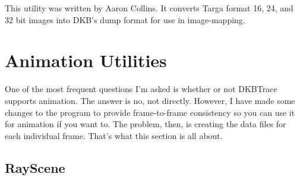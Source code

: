 This utility was written by Aaron Collins.  It converts Targa
format 16, 24, and 32 bit images into DKB's dump format for use in
image-mapping.

\section{Animation Utilities}

One of the most frequent questions I'm asked is whether or not DKBTrace
supports animation.  The answer is no, not directly.  However, I have made
some changes to the program to provide frame-to-frame consistency so you can
use it for animation if you want to.  The problem, then, is creating the data
files for each individual frame.  That's what this section is all about.

\subsection{RayScene}

